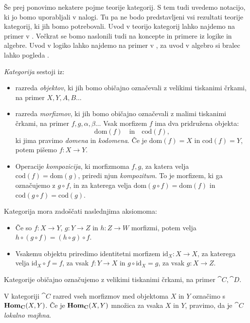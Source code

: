 \documentclass[../kategoricna_logika.tex]{subfiles}
\begin{document}
Še prej ponovimo nekatere pojme teorije kategorij.
S tem tudi uvedemo notacijo, ki jo bomo uporabljali v nalogi.
Tu pa ne bodo predstavljeni vsi rezultati teorije kategorij, ki jih bomo potrebovali.
Uvod v teorijo kategorij lahko najdemo na primer v
\cite{awodey2010category, riehl2017category, taslak2017}.
Večkrat se bomo naslonili tudi na koncepte in primere iz logike in algebre.
Uvod v logiko lahko najdemo na primer v \cite{prijatelj1992osnove1},
za uvod v algebro si bralec lahko pogleda \cite{bresar2018uvod}.
\begin{definicija}
  \emph{Kategorija} sestoji iz:
  \begin{itemize}
  \item razreda \emph{objektov}, ki jih bomo običajno označevali z
    velikimi tiskanimi črkami, na primer $X, Y, A, B \ldots$
  \item razreda \emph{morfizmov}, ki jih bomo običajno označevali z
    malimi tiskanimi črkami, na primer $f,g,\alpha,\beta \ldots$
    Vsak morfizem $f$ ima dva pridružena objekta:
    \[ \mathrm{dom}(f) \quad \text{in} \quad \mathrm{cod}(f), \]
    ki jima pravimo \emph{domena} in \emph{kodomena}. Če je $\mathrm{dom}(f)=X$
    in ${\mathrm{cod}(f)=Y}$, potem pišemo $f : X \to Y$.
  \item Operacije \emph{kompozicija}, ki morfizmoma $f,g$,
    za katera velja $\mathrm{cod}(f) = \mathrm{dom}(g)$,
    priredi njun \emph{kompozitum}. To je morfizem, ki ga označujemo z $g \circ f$, in
    za katerega velja $\mathrm{dom}(g \circ f) = \mathrm{dom}(f)$ in
    $\mathrm{cod}(g \circ f) = \mathrm{cod}(g)$. 
  \end{itemize}
Kategorija mora zadoščati naslednjima aksiomoma:
  \begin{itemize}
  \item Če so \( f: X \to Y\), \(g : Y \to Z\) in \(h : Z \to W\) morfizmi, potem
    velja \(h \circ (g \circ f) = (h \circ g) \circ f\).
  \item Vsakemu objektu priredimo identitetni morfizem
    $\mathrm{id}_X : X \to X$, za katerega velja $\mathrm{id}_X \circ f = f$,
    za vsak $f : Y \to X$ in $g \circ \mathrm{id}_X = g$, za vsak $g : X \to Z$.
\end{itemize}
Kategorije običajno označujemo z velikimi tiskanimi črkami, na primer $\cat{C}, \cat{D}$.
\end{definicija}
\begin{definicija}
  V kategoriji $\cat{C}$ razred vseh morfizmov med objektoma $X$ in $Y$ označimo s $\mathbf{Hom}_{{\operatorname{\mathbf{C}}}}(X,Y)$.
  Če je $\mathbf{Hom}_{{\operatorname{\mathbf{C}}}}(X,Y)$ množica za vsaka $X$ in $Y$, pravimo, da je $\cat{C}$
  \emph{lokalno majhna}.
\end{definicija}
\end{document}
